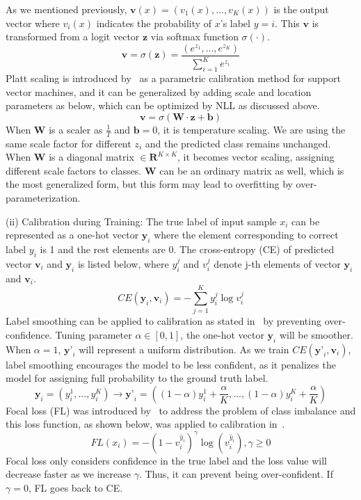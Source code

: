 As we mentioned previously, $\textbf{v}(x)=(v_1(x),...,v_K(x))$ is the output vector where $v_i(x)$ indicates the probability of $x$'s label $y=i$. This $\textbf{v}$ is transformed from a logit vector $\textbf{z}$ via softmax function $\sigma(\cdot)$.
\begin{equation}
    \textbf{v}=\sigma(\textbf{z})=\frac{( e^{z_1}, ..., e^{z_K})}{\sum_{i=1}^K e^{z_i}}
\end{equation}
Platt scaling is introduced by~\cite{platt1999probabilistic} as a parametric calibration method for support vector machines, and it can be generalized by adding scale and location parameters as below, which can be optimized by NLL as discussed above.
\begin{equation}
    \textbf{v}=\sigma(\textbf{W}\cdot\textbf{z}+\textbf{b})
\end{equation}
When $\textbf{W}$ is a scaler as $\frac{1}{T}$ and $\textbf{b}=0$, it is temperature scaling. We are using the same scale factor for different $z_i$ and the predicted class remains unchanged. When $\textbf{W}$ is a diagonal matrix $\in \mathbf{R}^{K\times K}$, it becomes vector scaling, assigning different scale factors to classes. $\textbf{W}$ can be an ordinary matrix as well, which is the most generalized form, but this form may lead to overfitting by over-parameterization.

(ii) Calibration during Training: The true label of input sample $x_i$ can be represented as a one-hot vector $\textbf{y}_i$ where the element corresponding to correct label $y_i$ is 1 and the rest elements are 0. The cross-entropy (CE) of predicted vector $\textbf{v}_i$ and $\textbf{y}_i$ is listed below, where $y_i^j$ and $v_i^j$ denote j-th elements of vector $\textbf{y}_{i}$ and $\textbf{v}_{i}$.
\begin{equation}
    CE(\textbf{y}_i,\textbf{v}_i)=-\sum_{j=1}^K y_i^j\log v_i^j
\end{equation}
Label smoothing can be applied to calibration as stated in~\cite{muller2019does} by preventing over-confidence. Tuning parameter $\alpha \in [0,1]$, the one-hot vector $\textbf{y}_i$ will be smoother. When $\alpha=1$, $\textbf{y'}_i$ will represent a uniform distribution. As we train $CE(\textbf{y'}_i,\textbf{v}_i)$, label smoothing encourages the model to be less confident, as it penalizes the model for assigning full probability to the ground truth label. 
\begin{equation}
    \textbf{y}_i=(y_i^1,...,y_i^K)\rightarrow\textbf{y'}_i=((1-\alpha)y_i^1+\frac{\alpha}{K},...,(1-\alpha)y_i^K+\frac{\alpha}{K})
\end{equation}
Focal loss (FL) was introduced by~\cite{lin2017focal} to address the problem of class imbalance and this loss function, as shown below, was applied to calibration in~\cite{mukhoti2020calibrating}. 
\begin{equation}
    FL(x_i)=-(1-v_i^{\hat{y}_i})^\gamma \log(v_i^{\hat{y}_i}), \gamma\geq 0
\end{equation}
Focal loss only considers confidence in the true label and the loss value will decrease faster as we increase $\gamma$. Thus, it can prevent being over-confident. If $\gamma=0$, FL goes back to CE.
